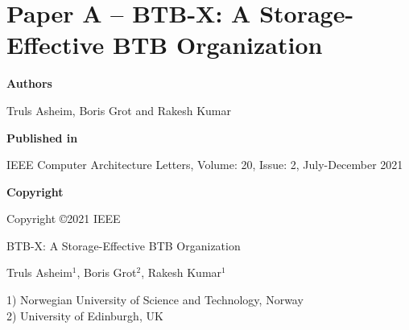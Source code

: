 \documentclass[../../../main.tex]{subfiles}
\begin{document}
\chapter{Paper A -- BTB-X: A Storage-Effective BTB Organization}
\label{chap:cal-paper}

\noindent \textbf{Authors}

\vspace*{0.3cm}

\noindent Truls Asheim, Boris Grot and Rakesh Kumar

\vspace*{0.7cm}

\noindent \textbf{Published in}

\vspace*{0.3cm}

\noindent IEEE Computer Architecture Letters, Volume: 20, Issue: 2, July-December 2021

\vspace*{0.7cm}

\noindent \textbf{Copyright}

\vspace*{0.3cm}

\noindent Copyright ©2021 IEEE

\newpage

\vspace*{0.1cm}

\begin{center}

\Huge{BTB-X: A Storage-Effective BTB Organization}

\vspace{0.6cm}

\large{Truls Asheim$^{1}$, Boris Grot$^{2}$, Rakesh Kumar$^{1}$}

\vspace{0.1cm}

\small{1) Norwegian University of Science and Technology, Norway}\\
\small{2) University of Edinburgh, UK}


\end{center}

\vspace{0.2cm}
\end{document}
